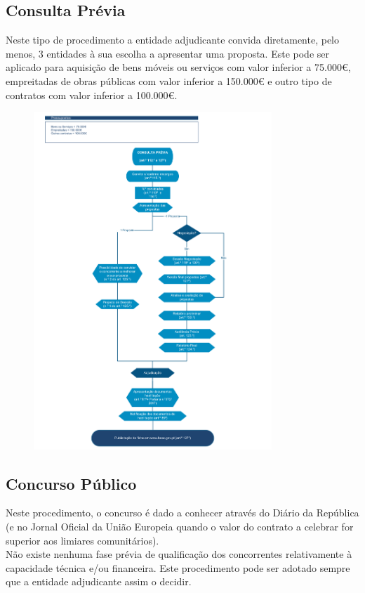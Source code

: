\documentclass{book}
\begin{document}
	
	\newpage
	\subsection*{Consulta Prévia}
	
	Neste tipo de procedimento a entidade adjudicante convida diretamente, pelo menos, 3 entidades à sua escolha a apresentar uma proposta. Este pode ser aplicado para aquisição de bens móveis ou serviços com valor inferior a 75.000€, empreitadas de obras públicas com valor inferior a 150.000€  e outro tipo de contratos com valor inferior a 100.000€. 
	
	\begin{figure}[H]
		\centering
		\includegraphics[width=0.8\textwidth]{consulta_previa_ccp.png}
		\caption{}
		\label{}
	\end{figure}
	
	
	\newpage
	\subsection*{Concurso Público}
	
	Neste procedimento, o concurso é dado a conhecer através do Diário da República (e no Jornal Oficial da União Europeia quando o valor do contrato a celebrar for superior aos limiares comunitários).\\
	Não existe nenhuma fase prévia de qualificação dos concorrentes relativamente à capacidade técnica e/ou financeira. Este procedimento pode ser adotado sempre que a entidade adjudicante assim o decidir. 
	
\end{document}

